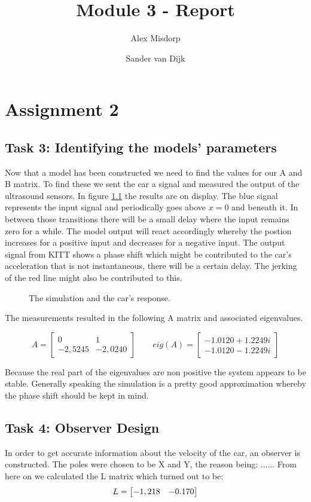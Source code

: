 \documentclass[final]{scrreprt} %
\title{Module 3 - Report}
\author{Alex {Misdorp} \and Sander {van Dijk}}
\begin{document}
\chapter{Assignment 2}
\section*{Task 3: Identifying the models' parameters}

Now that a model has been constructed we need to find the values for our A and B matrix. To find these we sent the car a signal and measured the output of the ultrasound sensors. In figure \ref{fig:KITT-input-output-model} the results are on display.
The blue signal represents the input signal and periodically goes above $x=0$ and beneath it. In between those transitions there will be a small delay where the input remains zero for a while. The model output will react accordingly whereby the postion increases for a positive input and decreases for a negative input.
The output signal from KITT shows a phase shift which might be contributed to the car's acceleration that is not instantaneous, there will be a certain delay. The jerking of the red line might also be contributed to this.

\begin{figure}[H]
	\centering
    	\setlength\figureheight{4cm}
    	\setlength{}
    	    	
    	\caption{The simulation and the car's response.}
    	\label{fig:KITT-input-output-model}
\end{figure}

The measurements resulted in the following A matrix and associated eigenvalues.

\begin{equation}
A=
\begin{bmatrix}
  0 & 1 \\
  -2,5245 & -2,0240
 \end{bmatrix}
\qquad
eig(A)=
\begin{bmatrix}
 -1.0120 + 1.2249i \\
  -1.0120 - 1.2249i
 \end{bmatrix}
\end{equation}

Because the real part of the eigenvalues are non positive the system appears to be stable. Generally speaking the simulation is a pretty good approximation whereby the phase shift should be kept in mind.

\section*{Task 4: Observer Design}
In order to get accurate information about the velocity of the car, an observer is constructed. The poles were chosen to be X and Y, the reason being: ...... From here on we calculated the L matrix which turned out to be:
\begin{equation}
\centering
L =
\begin{bmatrix}
  -1,218 & -0.170
\end{bmatrix}
\end{equation}
\end{document}
